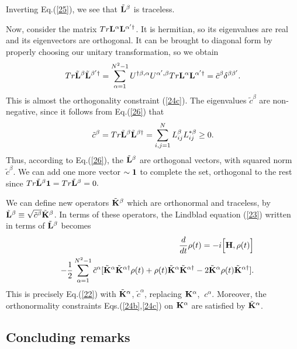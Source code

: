 \documentclass[aps,pra,twocolumn,amssymb, amsfonts,amsmath,showpacs, superscriptaddress]{revtex4}
\begin{document}
Inverting Eq.(\ref{25}), we see that $\tilde{\bf L}^{\beta}$ is traceless. 

Now, consider the matrix $Tr{\bf L}^{\alpha}{\bf L}^{\alpha'\dagger}$.  It is hermitian, so its eigenvalues are real and its eigenvectors are orthogonal.  It can be brought to diagonal form by properly choosing our unitary transformation, so we obtain
\begin{equation}\label{26}
Tr \tilde{\bf L}^{\beta}\tilde{\bf L}^{\beta'\dagger}=\sum_{\alpha=1}^{N^{2}-1}U^{\dagger\beta, \alpha} U^{\alpha', \beta}Tr{\bf L}^{\alpha}{\bf L}^{\alpha'\dagger}=\tilde c^{\beta}\delta^{\beta\beta'}.
\end{equation}
This is almost the orthogonality constraint  (\ref{24c}).  The eigenvalues $\tilde c^{\beta}$ are non-negative, since it follows from Eq.(\ref{26}) that 
\[
\tilde c^{\beta}=Tr \tilde{\bf L}^{\beta}\tilde{\bf L}^{\beta\dagger}= \sum_{i,j=1}^{N}L_{ij}^{\beta}L_{ij}^{*\beta}\geq 0.
\]
Thus, according to Eq.(\ref{26}), the $\tilde{\bf L}^{\beta}$  are orthogonal vectors, 
with squared norm $\tilde c^{\beta}$.  We can add one more vector $\sim {\bf 1}$ to complete the set, orthogonal to the rest since $Tr \tilde{\bf L}^{\beta}{\bf 1}=Tr \tilde{\bf L}^{\beta}=0.$

We can define  new operators $\tilde{\bf K}^{\beta}$ which are orthonormal and traceless, by $\tilde{\bf L}^{\beta}\equiv\sqrt{\tilde c^{\beta}}\tilde{\bf K}^{\beta}$.  In terms of these operators, the Lindblad equation (\ref{23}) written in terms of $\tilde{\bf L}^{\beta}$ becomes
\begin{eqnarray}\label{27}
&&\frac{d}{dt}{\bf\rho}(t)=-i\Big[{\bf H}, {\bf\rho}(t)\Big]\nonumber\\
&&-\frac{1}{2}\sum_{\alpha=1}^{N^{2}-1}\tilde c^{\alpha}[\tilde{\bf K}^{\alpha}\tilde{\bf K}^{\alpha\dagger} {\bf\rho}(t)+ {\bf\rho}(t)\tilde{\bf K}^{\alpha}\tilde{\bf K}^{\alpha\dagger}-2\tilde{\bf K}^{\alpha}{\bf\rho}(t)\tilde{\bf K}^{\alpha\dagger}].\nonumber\\
 \end{eqnarray}
\noindent This is precisely Eq.(\ref{22}) with $\tilde{\bf K}^{\alpha}$, $\tilde c^{\alpha}$, replacing ${\bf K}^{\alpha}$, $\ c^{\alpha}$.  Moreover, the orthonormality constraints Eqs.(\ref{24b},\ref{24c}) on ${\bf K}^{\alpha}$ are satisfied by $\tilde{\bf K}^{\alpha}$.  

\subsection{Concluding remarks}
 
\end{document}
